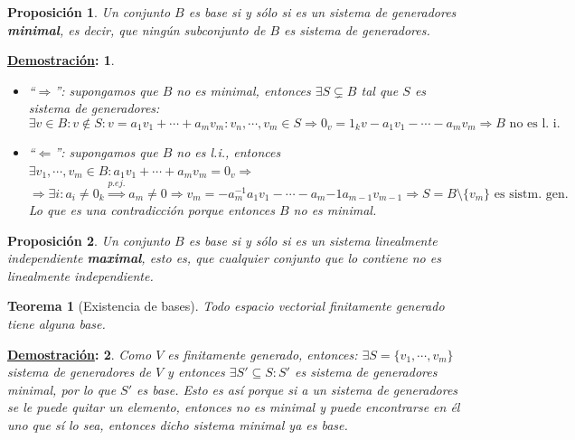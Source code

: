 \documentclass[10pt,a4paper,openright]{book}
\theoremstyle{break}
\newtheorem*{theo}{Teorema}
\newtheorem*{prop}{Proposición}
\newtheorem*{demo}{\underline{Demostración}:}
\begin{document}
\begin{prop}
Un conjunto $B$ es base si y sólo si es un sistema de generadores \textbf{minimal}, es decir, que ningún subconjunto de $B$ es sistema de generadores.
\end{prop}
\begin{demo}
\begin{itemize}
\item ``$\Rightarrow$'':
	supongamos que $B$ no es minimal, entonces $\exists S\subsetneq B$ tal que $S$ es sistema de generadores:
	$$\exists v\in B: v\notin S: v=a_1v_1+\cdots+a_mv_m: v_n, \cdots, v_m\in S\Rightarrow 0_v=1_kv-a_1v_1-\cdots-a_mv_m\Rightarrow B\mbox{ no es l. i.}$$
	
\item ``$\Leftarrow$'':
	supongamos que $B$ no es l.i., entonces $\exists v_1, \cdots, v_m\in B: a_1v_1+\cdots+ a_mv_m=0_v\Rightarrow$
	$$\Rightarrow \exists i: a_i\neq 0_k\stackrel{p.ej.}{\Rightarrow}a_m\neq 0\Rightarrow v_m=-a_m^{-1}a_1v_1-\cdots-a_m{-1}a_{m-1}v_{m-1}\Rightarrow S=B\mbox{\textbackslash}\{v_m\} \mbox{ es sistm. gen.}$$
	Lo que es una contradicción porque entonces $B$ no es minimal.
\end{itemize}
\end{demo}

\begin{prop}
Un conjunto $B$ es base si y sólo si es un sistema linealmente independiente \textbf{maximal}, esto es, que cualquier conjunto que lo contiene no es linealmente independiente.
\end{prop}

\begin{theo}[Existencia de bases]
Todo espacio vectorial finitamente generado tiene alguna base.
\end{theo}
\begin{demo}
Como $V$ es finitamente generado, entonces: $\exists S=\{v_1, \cdots, v_m\}$ sistema de generadores de $V$ y entonces $\exists S'\subseteq S: S'$ es sistema de generadores minimal, por lo que $S'$ es base. Esto es así porque si a un sistema de generadores se le puede quitar un elemento, entonces no es minimal y puede encontrarse en él uno que sí lo sea, entonces dicho sistema minimal ya es base.\par
\end{demo}
\end{document}

